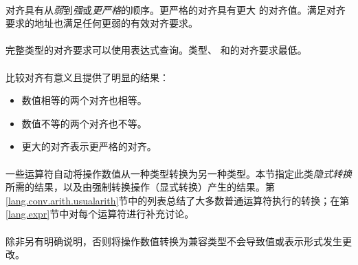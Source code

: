 {\paragraph{}
对齐具有从\textit{弱}到\textit{强}或\textit{更严格}的顺序。更严格的对齐具有更大
的对齐值。满足对齐要求的地址也满足任何更弱的有效对齐要求。

\paragraph{}
完整类型的对齐要求可以使用表达式查询。类型、
和的对齐要求最低。

\paragraph{}
比较对齐有意义且提供了明显的结果：
\begin{itemize}
  \item{数值相等的两个对齐也相等。}
  \item{数值不等的两个对齐也不等。}
  \item{更大的对齐表示更严格的对齐。}
\end{itemize}

\paragraph{}
一些运算符自动将操作数值从一种类型转换为另一种类型。本节指定此类\textit{隐式转换
}所需的结果，以及由强制转换操作（显式转换）产生的结果。第
\ref{lang.conv.arith.usualarith}节中的列表总结了大多数普通运算符执行的转换；在第
\ref{lang.expr}节中对每个运算符进行补充讨论。

\paragraph{}
除非另有明确说明，否则将操作数值转换为兼容类型不会导致值或表示形式发生更改。


}
